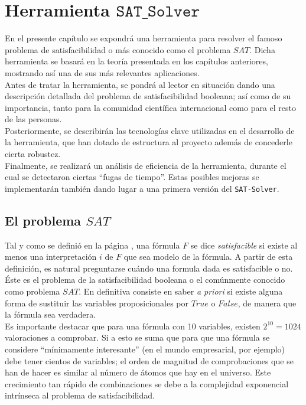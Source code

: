 \chapter{Herramienta $\mathtt{SAT\_Solver}$}

En el presente capítulo se expondrá una herramienta para resolver el famoso problema de satisfacibilidad o más conocido como el problema $SAT$. Dicha herramienta se basará en la teoría presentada en los capítulos anteriores, mostrando así una de sus más relevantes aplicaciones. \\

Antes de tratar la herramienta, se pondrá al lector en situación dando una descripción detallada del problema de satisfacibilidad booleana; así como de su importancia, tanto para la comunidad científica internacional como para el resto de las personas.\\

Posteriormente, se describirán las tecnologías clave utilizadas en el desarrollo de la herramienta, que han dotado de estructura al proyecto además de concederle cierta robustez.\\

Finalmente, se realizará un análisis de eficiencia de la herramienta, durante el cual se detectaron ciertas ``fugas de tiempo''. Estas posibles mejoras se implementarán también dando lugar a una primera versión del \texttt{SAT-Solver}.

\newpage
\section{El problema $SAT$}

Tal y como se definió en la página \pageref{def:sat}, una fórmula $F$ se dice \textit{satisfacible} si existe al menos una interpretación $i$ de $F$ que sea modelo de la fórmula. A partir de esta definición, es natural preguntarse cuándo una formula dada es satisfacible o no. Éste es el problema de la satisfacibilidad booleana o el comúnmente conocido como problema $SAT$. En definitiva consiste en saber \textit{a priori} si existe alguna forma de sustituir las variables proposicionales por $True$ o $False$, de manera que la fórmula sea verdadera. \\

Es importante destacar que para una fórmula con 10 variables, existen $2^{10} = 1024$ valoraciones a comprobar. Si a esto se suma que para que una fórmula se considere ``mínimamente interesante'' (en el mundo empresarial, por ejemplo) debe tener cientos de variables; el orden de magnitud de comprobaciones que se han de hacer es similar al número de átomos que hay en el universo. Este crecimiento tan rápido de combinaciones se debe a la complejidad exponencial intrínseca al problema de satisfacibilidad. \\

